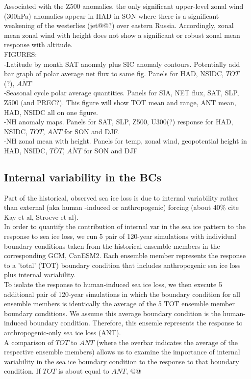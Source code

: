 \documentclass[twocol]{ametsoc}
\begin{document}
Associated with the Z500 anomalies, the only significant upper-level zonal wind (300hPa) anomalies appear in HAD in SON where there is a significant weakening of the westerlies (jet@@?) over eastern Russia. Accordingly, zonal mean zonal wind with height does not show a significant or robust zonal mean response with altitude.\\

FIGURES:\\
-Latitude by month SAT anomaly plus SIC anomaly contours. Potentially add bar graph of polar average net flux to same fig. Panels for HAD, NSIDC, $\overline{TOT}$ (?), $\overline{ANT}$\\
-Seasonal cycle polar average quantities. Panels for SIA, NET flux, SAT, SLP, Z500 (and PREC?). This figure will show TOT mean and range, ANT mean, HAD, NSIDC all on one figure.\\
-NH anomaly maps. Panels for SAT, SLP, Z500, U300(?) response for HAD, NSIDC, $\overline{TOT}$, $\overline{ANT}$ for SON and DJF.\\
-NH zonal mean with height. Panels for temp, zonal wind, geopotential height in HAD, NSIDC, $\overline{TOT}$, $\overline{ANT}$ for SON and DJF \\

\subsection{Internal variability in the BCs}

Part of the historical, observed sea ice loss is due to internal variability rather than external (aka human -induced or anthropogenic) forcing (about 40\% cite Kay et al, Stroeve et al). \\
In order to quantify the contribution of internal var in the sea ice pattern to the response to sea ice loss, we run 5 pair of 120-year simulations with individual boundary conditions taken from the historical ensemble members in the corresponding GCM, CanESM2. Each ensemble member represents the response to a 'total' (TOT) boundary condition that includes anthropogenic sea ice loss plus internal variability. \\
To isolate the response to human-induced sea ice loss, we then execute 5 additional pair of 120-year simulations in which the boundary condition for all ensemble members is identically the average of the 5 TOT ensemble member boundary conditions. We assume this average boundary condition is the human-induced boundary condition. Therefore, this ensemle represents the response to anthropogenic-only sea ice loss (ANT).\\
A comparison of $\overline{TOT}$ to $\overline{ANT}$ (where the overbar indicates the average of the respective ensemble members) allows us to examine the importance of internal variability in the sea ice boundary condition to the response to that boundary condition. If $\overline{TOT}$ is about equal to $\overline{ANT}$, @@\\
\end{document}
